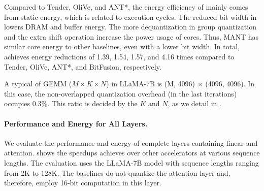 Compared to Tender, OliVe, and ANT*, the energy efficiency of \proj mainly comes from static energy, which is related to execution cycles.
The reduced bit width in \proj lowers DRAM and buffer energy.
The more dequantization in group quantization and the extra shift operation increase the power usage of cores.
Thus, MANT has similar core energy to other baselines, even with a lower bit width.
In total, \proj achieves energy reductions of 1.39, 1.54, 1.57, and 4.16 times compared to Tender, OliVe, ANT*, and BitFusion, respectively.

A typical of GEMM ($M \times K \times N$) in LLaMA-7B is (M, 4096) $\times$ (4096, 4096). 
In this case, the non-overlapped quantization overhead (in the last iterations) occupies 0.3\%. This ratio is decided by the $K$ and $N$, as we detail in .







\paragraph{Performance and Energy for All Layers. }
We evaluate the performance and energy of complete layers containing linear and attention.
 shows the speedups \proj achieves over other accelerators at various sequence lengths.
The evaluation uses the LLaMA-7B model with sequence lengths ranging from 2K to 128K.
The baselines do not quantize the attention layer and, therefore, employ 16-bit computation in this layer.

